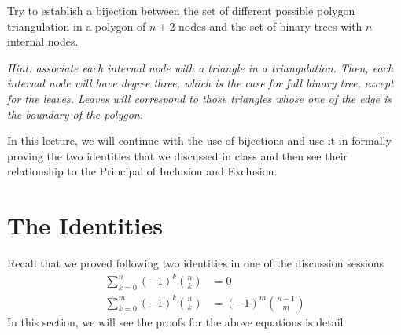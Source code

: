 
\begin{exercise}
\item Try to establish a bijection between the set of different possible polygon triangulation in a polygon of $n+2$ nodes and the set of binary trees with $n$ internal nodes.

\textit{Hint: associate each internal node with a triangle in a triangulation. Then, each internal node will have degree three, which is the case for full binary tree, except for the leaves. Leaves will correspond to those triangles whose one of the edge is the boundary of the polygon.}
\end{exercise}


In this lecture, we will continue with the use of bijections and use it in formally proving the two identities that we discussed in class and then see their relationship to the Principal of Inclusion and Exclusion. 

\section{The Identities}
Recall that we proved following two identities in one of the discussion sessions
\begin{align}
     \sum_{k=0}^n (-1)^k{n\choose k} &= 0 \label{REV1}\\ 
     \sum_{k=0}^m (-1)^k{n\choose k} &= (-1)^m{n-1\choose m} \label{REV2}
\end{align}
In this section, we will see the proofs for the above equations is detail
